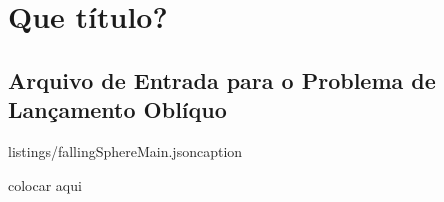 \chapter{\alert{Que título?}} \label{app:code_listings}

\section{Arquivo de Entrada para o Problema de Lançamento Oblíquo}


	{listings/fallingSphereMain.json}caption

\alert{colocar aqui}

